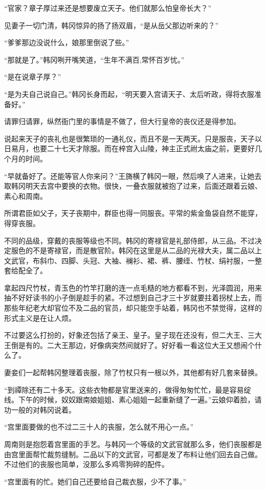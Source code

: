“官家？章子厚过来还是想要废立天子。他们就那么怕皇帝长大？”

见妻子一切门清，韩冈惊异的扬了扬双眉，“是从岳父那边听来的？”

“爹爹那边没说什么，娘那里倒说了些。”

“那就是了。”韩冈咧开嘴笑道，“生年不满百,常怀百岁忧。”

“是在说章子厚？”

“是为夫自己说自己。”韩冈长身而起，“明天要入宫请天子、太后听政，得将衣服准备好。”

请罪归请罪，纵然衙门里的事情是不做了，但大行皇帝的丧仪还是得参加。

说起来天子的丧礼也是很繁琐的一通礼仪，而且不是一天两天。只是服丧，天子以日易月，也要二十七天才除服。而在梓宫入山陵，神主正式祔太庙之前，更要好几个月的时间。

“早就备好了。还能等官人你来问？”王旖横了韩冈一眼，然后唤了人进来，让她去取韩冈明天去宫中要换的衣物。很快，一叠衣服就被抱了过来，后面还跟着云娘、素心和周南。

所谓君臣如父子，天子丧期中，群臣也得一同服丧。平常的紫金鱼袋自然不能穿，得穿丧服。

不同的品级，穿戴的丧服等级也不同。韩冈的寄禄官是礼部侍郎，从三品。不过决定服色的不是寄禄官，而是散官阶。韩冈在这里是从二品的光禄大夫，属二品以上文武官，布斜巾、四脚、头冠、大袖、襕衫、裙、裤、腰绖、竹杖、绢衬服，一整套给配全了。

拿起四尺竹杖，青玉色的竹竿打磨的连一点毛糙的地方都看不到，光泽圆润，用来抽不好好读书的小子倒是趁手的紧。不过想到自己才三十岁就要拄着拐杖上去，而那些年纪老大却官位不及二品的官员，却只能空手站着，韩冈也不禁觉得，这样的形式主义是在让人烦。

不过要这么打扮的，好象还包括了亲王、皇子。皇子现在还没有，但二大王、三大王倒是有的。二大王那边，好像病突然间就好了。好好看一看这位大王又想闹个什么了。

妻妾们一起帮韩冈整理着丧服，除了竹杖只有一根以外，其他都有好几套来替换。

“到禫除还有二十多天。这些衣物都是官里送来的，做得匆匆忙忙，最是容易绽线。下午的时候，奴奴跟南娘姐姐、素心姐姐一起重新缝了一遍。”云娘仰着脸，请功一般的对韩冈说着。

“宫里面要做的也不过二三十人的丧服，怎么就不用心一点。”

周南则是抱怨着宫里面的手艺。与韩冈一个等级的文武官就那么多，他们丧服都是由宫里面帮忙裁剪缝制。二品以下的文武官，可都是发了布料让他们回去自己做。不过他们的丧服也简单，没那么多鸡零狗碎的配件。

“宫里面有的忙。她们自己还要给自己裁衣服，少不了事。”

